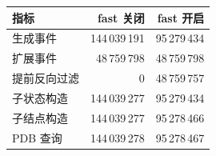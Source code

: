 \begin{tabular}{lrr}
\toprule
\textbf{指标} & \textbf{fast 关闭} & \textbf{fast 开启} \\
\midrule
生成事件 & 144\,039\,191 & 95\,279\,434 \\
扩展事件 & 48\,759\,798 & 48\,759\,798 \\
提前反向过滤 & 0 & 48\,759\,757 \\
子状态构造 & 144\,039\,277 & 95\,279\,434 \\
子结点构造 & 144\,039\,277 & 95\,278\,466 \\
PDB 查询 & 144\,039\,278 & 95\,278\,467 \\
\bottomrule
\end{tabular}
